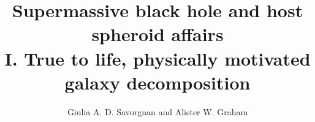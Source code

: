 \documentclass[preprint2]{emulateapj}
\begin{document}
\title{Supermassive black hole and host spheroid affairs \\ I. True to life, physically motivated galaxy decomposition}

\author{Giulia A. D. Savorgnan and Alister W. Graham}




\end{document}
